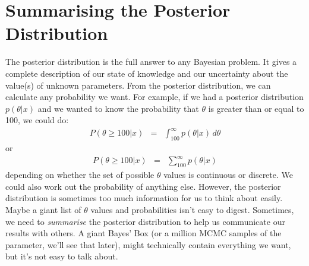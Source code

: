 \chapter{Summarising the Posterior Distribution}
The posterior distribution is the full answer to any Bayesian problem. It gives
a complete description of our state of knowledge and our uncertainty about the
value(s) of unknown
parameters. From the posterior distribution, we can calculate any probability
we want. For example, if we had a posterior distribution $p(\theta|x)$ and we
wanted to know the probability that $\theta$ is greater than or equal to 100, we could do:
\begin{eqnarray}
P(\theta \geq 100 | x) &=& \int_{100}^\infty p(\theta | x) \, d\theta
\end{eqnarray}
or
\begin{eqnarray}
P(\theta \geq 100 | x) &=& \sum_{100}^\infty p(\theta | x)
\end{eqnarray}
depending on whether the set of possible $\theta$ values is continuous or
discrete. We could also work out the probability of anything else.
However, the posterior distribution is sometimes too much
information for us to think about easily. Maybe a giant list of $\theta$
values and probabilities isn't easy to digest. Sometimes,
we need to {\it summarise} the posterior distribution to help us
communicate our results with others. A giant Bayes' Box (or a million MCMC
samples of the parameter, we'll see that later), might technically
contain everything we want, but it's not easy to talk about.

